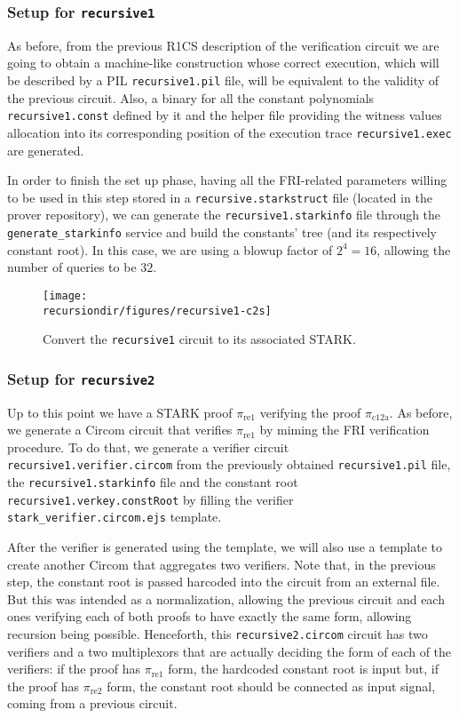 \subsubsection{Setup \ctos for \texttt{recursive1}}

As before, from the previous R1CS description of the verification circuit we are going to obtain a machine-like construction whose correct execution, which will be described by a PIL \texttt{recursive1.pil} file, will be equivalent to the validity of the previous circuit. Also, a binary for all the constant polynomials \texttt{recursive1.const} defined by it and the helper file providing the witness values allocation into its corresponding position of the execution trace \texttt{recursive1.exec} are generated.

In order to finish the set up phase, having all the FRI-related parameters willing to be used in this step stored in a \texttt{recursive.starkstruct} file (located in the prover repository), we can generate the \texttt{recursive1.starkinfo} file through the \texttt{generate\_starkinfo} service and build the constants' tree (and its respectively constant root). In this case, we are using a blowup factor of $2^4 = 16$, allowing the number of queries to be $32$. 

\begin{figure}[H]
\centering
\texttt{[image: \\recursiondir/figures/recursive1-c2s]}
\caption{Convert the \texttt{recursive1} circuit to its associated STARK.}
\label{fig:recursive1-c2s}
\end{figure}



\subsubsection{Setup \stoc for \texttt{recursive2}}

Up to this point we have a STARK proof $\pi_{\text{re1}}$ verifying the proof $\pi_{\text{c12a}}$. As before, we generate a Circom circuit that verifies $\pi_{\text{re1}}$ by miming the FRI verification procedure. To do that, we generate a verifier circuit \texttt{recursive1.verifier.circom} from the previously obtained \texttt{recursive1.pil} file, the \texttt{recursive1.starkinfo} file and the constant root \texttt{recursive1.verkey.constRoot} by filling the verifier \texttt{stark\_verifier.circom.ejs} template.

After the verifier is generated using the template, we will also use a template to create another Circom that aggregates two verifiers. Note that, in the previous step, the constant root is passed harcoded into the circuit from an external file. But this was intended as a normalization, allowing the previous circuit and each ones verifying each of both proofs to have exactly the same form, allowing recursion being possible. Henceforth, this \texttt{recursive2.circom} circuit has two verifiers and a two multiplexors that are actually deciding the form of each of the verifiers: if the proof has $\pi_{\text{re1}}$ form, the hardcoded constant root is input but, if the proof has $\pi_{\text{re2}}$ form, the constant root should be connected as input signal, coming from a previous circuit. 


